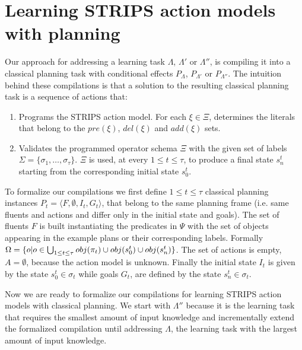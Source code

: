 \documentclass[letterpaper]{article} %
\newcommand{\tup}[1]{{\langle #1 \rangle}}
\begin{document}
\section{Learning STRIPS action models with planning}
Our approach for addressing a learning task $\Lambda$, $\Lambda'$ or $\Lambda''$, is compiling it into a classical planning task with conditional effects $P_{\Lambda}$, $P_{\Lambda'}$ or $P_{\Lambda''}$. The intuition behind these compilations is that a solution to the resulting classical planning task is a sequence of actions that:
\begin{enumerate}
\item Programs the STRIPS action model. For each $\xi\in\Xi$, determines the literals that belong to the $pre(\xi)$, $del(\xi)$ and $add(\xi)$ sets.
\item Validates the programmed operator schema $\Xi$ with the given set of labels $\Sigma=\{\sigma_1,\ldots,\sigma_{\tau}\}$. $\Xi$ is used, at every {\small $1\leq t\leq \tau$}, to produce a final state $s_{n}^t$ starting from the corresponding initial state $s_0^t$.
\end{enumerate}

To formalize our compilations we first define {\small $1\leq t\leq \tau$} classical planning instances $P_t=\tup{F,\emptyset,I_t,G_t}$, that belong to the same planning frame (i.e. same fluents and actions and differ only in the initial state and goals). The set of fluents $F$ is built instantiating the predicates in $\Psi$ with the set of objects appearing in the example plans or their corresponding labels. Formally $\Omega=\{o|o\in \bigcup_{\small 1\leq t\leq \tau} obj(\pi_t)\cup obj(s_0^t)\cup obj(s_n^t)\}$. The set of actions is empty, $A=\emptyset$, because the action model is unknown. Finally the initial state $I_t$ is given by the state $s_0^t\in \sigma_t$ while goals $G_t$, are defined by the state $s_n^t\in \sigma_t$. 

Now we are ready to formalize our compilations for learning STRIPS action models with classical planning. We start with $\Lambda''$ because it is the learning task that requires the smallest amount of input knowledge and incrementally extend the formalized compilation until addressing $\Lambda$, the learning task with the largest amount of input knowledge.
\end{document}
